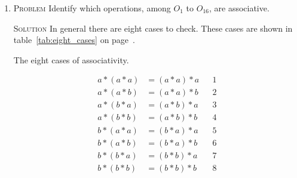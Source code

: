 \documentclass{amsart}
\newcommand{\Solution}{\textsc{Solution}\xspace}
\newcommand{\Problem}{\textsc{Problem}\xspace}
\begin{document}
\begin{enumerate}
   \item \Problem Identify which operations, among $O_1$ to $O_{16}$, are 
   associative.

   \noindent \Solution 
   In general there are eight cases to check. These cases are shown in
   table~\ref{tab:eight_cases} on page~\pageref{tab:eight_cases}.
%
   \begin{table}
   \caption{The eight cases of associativity.}
   \label{tab:eight_cases}
   \begin{align*}
      a * (a * a) & = (a * a) * a && 1\\
      a * (a * b) & = (a * a) * b && 2\\
      a * (b * a) & = (a * b) * a && 3\\
      a * (b * b) & = (a * b) * b && 4\\
      b * (a * a) & = (b * a) * a && 5\\
      b * (a * b) & = (b * a) * b && 6\\
      b * (b * a) & = (b * b) * a && 7\\
      b * (b * b) & = (b * b) * b && 8
   \end{align*}
   \end{table}


\end{enumerate}
\end{document}
